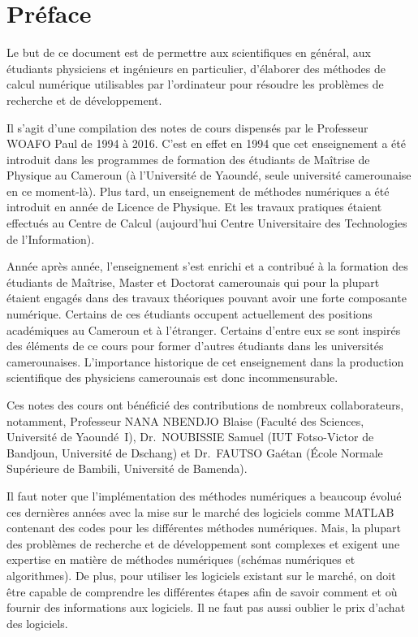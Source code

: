 \chapter*{Préface}

Le but de ce document est de permettre aux scientifiques en général, aux
étudiants physiciens et ingénieurs en particulier, d'élaborer des méthodes de
calcul numérique utilisables par l'ordinateur pour résoudre les problèmes de
recherche et de développement.

Il s'agit d'une compilation des notes de cours dispensés par le Professeur
WOAFO Paul de 1994 à 2016. C'est en effet en 1994 que cet enseignement a été
introduit dans les programmes de formation des étudiants de Maîtrise de
Physique au Cameroun (à l'Université de Yaoundé, seule université
camerounaise en ce moment-là). Plus tard, un enseignement de méthodes
numériques a été introduit en année de Licence de Physique. Et les travaux
pratiques étaient effectués au Centre de Calcul (aujourd'hui Centre
Universitaire des Technologies de l'Information).

Année après année, l'enseignement s'est enrichi et a contribué à la formation
des étudiants de Maîtrise, Master et Doctorat camerounais qui pour la plupart
étaient engagés dans des travaux théoriques pouvant avoir une forte composante
numérique. Certains de ces étudiants occupent actuellement des positions
académiques au Cameroun et à l'étranger. Certains d'entre eux se sont inspirés
des éléments de ce cours pour former d'autres étudiants dans les universités
camerounaises. L'importance historique de cet enseignement dans la production
scientifique des physiciens camerounais est donc incommensurable.

Ces notes des cours ont bénéficié des contributions de nombreux
collaborateurs, notamment, Professeur NANA NBENDJO Blaise (Faculté des
Sciences, Université de Yaoundé~I), Dr.~NOUBISSIE Samuel (IUT Fotso-Victor de
Bandjoun, Université de Dschang) et Dr.~FAUTSO Gaétan (École Normale
Supérieure de Bambili, Université de Bamenda).

Il faut noter que l'implémentation des méthodes numériques a beaucoup évolué
ces dernières années avec la mise sur le marché des logiciels comme MATLAB
contenant des codes pour les différentes méthodes numériques. Mais, la plupart
des problèmes de recherche et de développement sont complexes et exigent une
expertise en matière de méthodes numériques (schémas numériques et
algorithmes). De plus, pour utiliser les logiciels existant sur le marché, on
doit être capable de comprendre les différentes étapes afin de savoir comment
et où fournir des informations aux logiciels. Il ne faut pas aussi oublier le
prix d'achat des logiciels.

